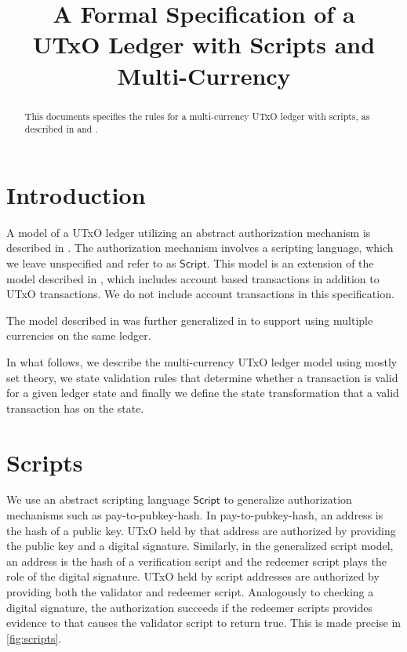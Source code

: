 \documentclass[11pt,a4paper]{article}
\newcommand{\type}[1]{\mathsf{#1}}
\newcommand{\Script}{\type{Script}}
\begin{document}
\title{A Formal Specification of a \\
       UTxO Ledger with Scripts and Multi-Currency}

\author{}


\maketitle

\begin{abstract}
This documents specifies the rules for a multi-currency UTxO ledger with scripts,
as described in \cite{multi_currency} and \cite{utxo_scripts}.
\end{abstract}

\tableofcontents
\listoffigures

\section{Introduction}

A model of a UTxO ledger utilizing an abstract authorization mechanism is
described in \cite{utxo_scripts}.  The authorization mechanism involves a
scripting language, which we leave unspecified and refer to as $\Script$.
This model is an extension of the model described in \cite{chimeric},
which includes account based transactions in addition to UTxO transactions.
We do not include account transactions in this specification.

The model described in \cite{utxo_scripts} was further generalized in
\cite{multi_currency} to support using multiple currencies on the same ledger.

In what follows, we describe the multi-currency UTxO ledger model using
mostly set theory, we state validation rules that determine whether a transaction
is valid for a given ledger state and finally we define the state transformation
that a valid transaction has on the state.

\section{Scripts}

We use an abstract scripting language $\Script$ to generalize authorization
mechanisms such as pay-to-pubkey-hash.
In pay-to-pubkey-hash, an address is the hash of a public key.
UTxO held by that address are authorized by providing the public key
and a digital signature.
Similarly, in the generalized script model, an address
is the hash of a verification script and the redeemer script
plays the role of the digital signature.
UTxO held by script addresses are authorized by providing both the validator
and redeemer script.  Analogously to checking a digital signature,
the authorization succeeds if the redeemer scripts provides evidence to
that causes the validator script to return true.
This is made precise in \cref{fig:scripts}.
\end{document}
